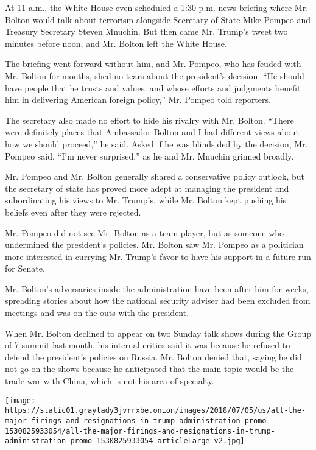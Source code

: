 At 11 a.m., the White House even scheduled a 1:30 p.m. news briefing
where Mr. Bolton would talk about terrorism alongside Secretary of State
Mike Pompeo and Treasury Secretary Steven Mnuchin. But then came Mr.
Trump's tweet two minutes before noon, and Mr. Bolton left the White
House.

The briefing went forward without him, and Mr. Pompeo, who has feuded
with Mr. Bolton for months, shed no tears about the president's
decision. ``He should have people that he trusts and values, and whose
efforts and judgments benefit him in delivering American foreign
policy,'' Mr. Pompeo told reporters.

The secretary also made no effort to hide his rivalry with Mr. Bolton.
``There were definitely places that Ambassador Bolton and I had
different views about how we should proceed,'' he said. Asked if he was
blindsided by the decision, Mr. Pompeo said, ``I'm never surprised,'' as
he and Mr. Mnuchin grinned broadly.

Mr. Pompeo and Mr. Bolton generally shared a conservative policy
outlook, but the secretary of state has proved more adept at managing
the president and subordinating his views to Mr. Trump's, while Mr.
Bolton kept pushing his beliefs even after they were rejected.

Mr. Pompeo did not see Mr. Bolton as a team player, but as someone who
undermined the president's policies. Mr. Bolton saw Mr. Pompeo as a
politician more interested in currying Mr. Trump's favor to have his
support in a future run for Senate.

Mr. Bolton's adversaries inside the administration have been after him
for weeks, spreading stories about how the national security adviser had
been excluded from meetings and was on the outs with the president.

When Mr. Bolton declined to appear on two Sunday talk shows during the
Group of 7 summit last month, his internal critics said it was because
he refused to defend the president's policies on Russia. Mr. Bolton
denied that, saying he did not go on the shows because he anticipated
that the main topic would be the trade war with China, which is not his
area of specialty.

\href{https://www.nytimes3xbfgragh.onion/interactive/2018/03/16/us/politics/all-the-major-firings-and-resignations-in-trump-administration.html}{}

\texttt{[image: https://static01.graylady3jvrrxbe.onion/images/2018/07/05/us/all-the-major-firings-and-resignations-in-trump-administration-promo-1530825933054/all-the-major-firings-and-resignations-in-trump-administration-promo-1530825933054-articleLarge-v2.jpg]}

